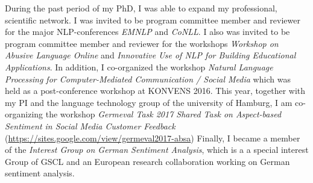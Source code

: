 \documentclass[11pt]{article}
\begin{document}
During the past period of my PhD, I was able to expand my professional, scientific network.
I was invited to be program committee member and reviewer for the major NLP-conferences \textit{EMNLP} and \textit{CoNLL}.
I also was invited to be program committee member and reviewer for the workshops \textit{Workshop on Abusive Language Online} and \textit{Innovative Use of NLP for Building Educational Applications}.
In addition, I co-organized the workshop \textit{Natural Language Processing for Computer-Mediated Communication / Social Media} which was held as a post-conference workshop at KONVENS 2016. 
This year, together with my PI and the language technology group of the university of Hamburg, I am co-organizing the workshop \textit{Germeval Task 2017
Shared Task on Aspect-based Sentiment in Social Media Customer Feedback} (\url{https://sites.google.com/view/germeval2017-absa})
Finally, I became a member of the \textit{Interest Group on German Sentiment Analysis}, which is a a special interest Group of GSCL and an European research collaboration working on German sentiment analysis.

%
%


\end{document}

